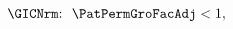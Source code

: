   \begin{align}
\text{{\GICNrm}:~~}    \PatPermGroFacAdj  & < 1, \phantom{\text{{\GICNrm}:~~}}\label{eq:GICNrm}
  \end{align}
